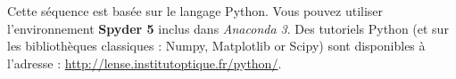 Cette séquence est basée sur le langage Python. Vous pouvez utiliser %
l'environnement \textbf{Spyder 5} inclus dans \textit{Anaconda 3}.
Des tutoriels Python (et sur les bibliothèques classiques : Numpy, Matplotlib or Scipy) sont disponibles à l'adresse : \href{http://lense.institutoptique.fr/python/}{http://lense.institutoptique.fr/python/}. 
